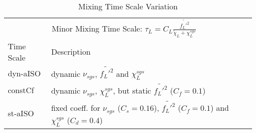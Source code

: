 \begin{table}[hbt]
    \caption{Mixing Time Scale Variation}
    \centering
    \begin{tabular}{llr}
        \toprule
        \multicolumn{2}{c}{Minor Mixing Time Scale: $\tau_L = C_{L} \frac{\widetilde{f_L'^2} }{\tilde{\chi}_L + \chi^{sgs}_L}$} \\
        \cmidrule(r){1-2}
        Time Scale & Description \\
        \midrule
        dyn-aISO & dynamic $\nu_{sgs}$, $\widetilde{f_L'^2}$ and $\chi^{sgs}_L$ \\
        constCf & dynamic $\nu_{sgs}$, $\chi^{sgs}_L$, but static $\widetilde{f_L'^2}$ ($C_f=0.1$) \\
        st-aISO & fixed coeff. for $\nu_{sgs}$ ($C_s=0.16$), $\widetilde{f_L'^2}$ ($C_f=0.1$) and $\chi^{sgs}_L$ ($C_d=0.4$) \\
        \bottomrule
    \end{tabular}
    \label{tab:label}
\end{table}